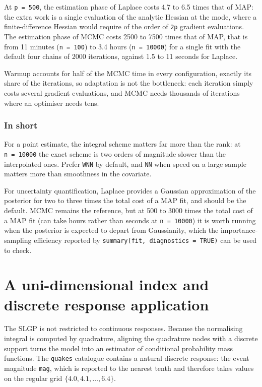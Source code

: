 \documentclass[
]{article}
\begin{document}
At \texttt{p\ =\ 500}, the estimation phase of Laplace costs 4.7 to 6.5 times that of MAP: the extra work is a single evaluation of the analytic Hessian at the mode, where a finite-difference Hessian would require of the order of \texttt{2p} gradient evaluations. The estimation phase of MCMC costs 2500 to 7500 times that of MAP, that is from 11 minutes (\texttt{n\ =\ 100}) to 3.4 hours (\texttt{n\ =\ 10000}) for a single fit with the default four chains of 2000 iterations, against 1.5 to 11 seconds for Laplace.

Warmup accounts for half of the MCMC time in every configuration, exactly its share of the iterations, so adaptation is not the bottleneck: each iteration simply costs several gradient evaluations, and MCMC needs thousands of iterations where an optimiser needs tens.

\subsubsection{In short}\label{in-short}

For a point estimate, the integral scheme matters far more than the rank: at \texttt{n\ =\ 10000} the exact scheme is two orders of magnitude slower than the interpolated ones. Prefer \texttt{WNN} by default, and \texttt{NN} when speed on a large sample matters more than smoothness in the covariate.

For uncertainty quantification, Laplace provides a Gaussian approximation of the posterior for
two to three times the total cost of a MAP fit, and should be the default. MCMC remains the reference, but at 500 to 3000 times the total cost of a MAP fit (can take hours rather than seconds at \texttt{n\ =\ 10000}) it is worth running when the posterior is expected to depart from Gaussianity, which the importance-sampling efficiency reported by \texttt{summary(fit,\ diagnostics\ =\ TRUE)} can be used to check.

\section{A uni-dimensional index and discrete response application}\label{a-uni-dimensional-index-and-discrete-response-application}

The SLGP is not restricted to continuous responses. Because the normalising integral is computed by quadrature, aligning the quadrature nodes with a discrete support turns the model into an estimator of conditional probability mass functions. The \texttt{quakes} catalogue contains a natural discrete response: the event magnitude \texttt{mag}, which is reported to the nearest tenth and therefore takes values on the regular grid \(\{4.0, 4.1, \dots, 6.4\}\).
\end{document}

